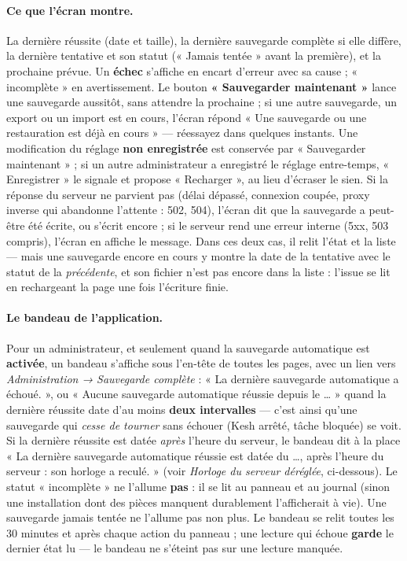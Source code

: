 \documentclass[a4paper,11pt,oneside]{article}
\begin{document}
\paragraph{Ce que l'écran montre.} La dernière réussite (date et taille), la dernière sauvegarde complète si elle diffère, la dernière tentative et son statut (« Jamais tentée » avant la première), et la prochaine prévue. Un \textbf{échec} s'affiche en encart d'erreur avec sa cause ; « incomplète » en avertissement. Le bouton \textbf{« Sauvegarder maintenant »} lance une sauvegarde aussitôt, sans attendre la prochaine ; si une autre sauvegarde, un export ou un import est en cours, l'écran répond « Une sauvegarde ou une restauration est déjà en cours » --- réessayez dans quelques instants. Une modification du réglage \textbf{non enregistrée} est conservée par « Sauvegarder maintenant » ; si un autre administrateur a enregistré le réglage entre-temps, « Enregistrer » le signale et propose « Recharger », au lieu d'écraser le sien. Si la réponse du serveur ne parvient pas (délai dépassé, connexion coupée, proxy inverse qui abandonne l'attente : 502, 504), l'écran dit que la sauvegarde a peut-être été écrite, ou s'écrit encore ; si le serveur rend une erreur interne (5xx, 503 compris), l'écran en affiche le message. Dans ces deux cas, il relit l'état et la liste --- mais une sauvegarde encore en cours y montre la date de la tentative avec le statut de la \emph{précédente}, et son fichier n'est pas encore dans la liste : l'issue se lit en rechargeant la page une fois l'écriture finie.

\paragraph{Le bandeau de l'application.} Pour un administrateur, et seulement quand la sauvegarde automatique est \textbf{activée}, un bandeau s'affiche sous l'en-tête de toutes les pages, avec un lien vers \emph{Administration → Sauvegarde complète} : « La dernière sauvegarde automatique a échoué. », ou « Aucune sauvegarde automatique réussie depuis le … » quand la dernière réussite date d'au moins \textbf{deux intervalles} --- c'est ainsi qu'une sauvegarde qui \emph{cesse de tourner} sans échouer (Kesh arrêté, tâche bloquée) se voit. Si la dernière réussite est datée \emph{après} l'heure du serveur, le bandeau dit à la place « La dernière sauvegarde automatique réussie est datée du …, après l'heure du serveur : son horloge a reculé. » (voir \emph{Horloge du serveur déréglée}, ci-dessous). Le statut « incomplète » ne l'allume \textbf{pas} : il se lit au panneau et au journal (sinon une installation dont des pièces manquent durablement l'afficherait à vie). Une sauvegarde jamais tentée ne l'allume pas non plus. Le bandeau se relit toutes les 30 minutes et après chaque action du panneau ; une lecture qui échoue \textbf{garde} le dernier état lu --- le bandeau ne s'éteint pas sur une lecture manquée.
\end{document}
